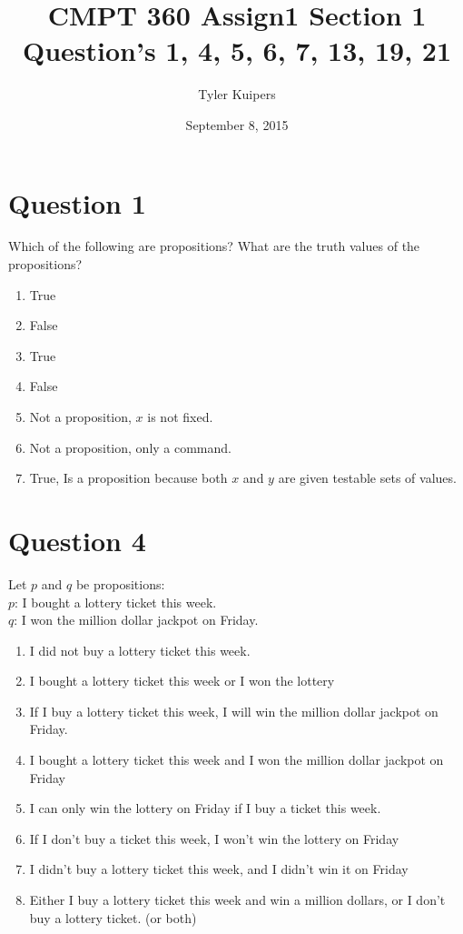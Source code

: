 \documentclass[12pt]{extarticle}
\title{CMPT 360 Assign1 Section 1\\ Question's 1, 4, 5, 6, 7, 13, 19, 21}
\author{Tyler Kuipers}
\date{September 8, 2015}
\begin{document}
\maketitle
\section*{Question 1}
	Which of the following are propositions? 
	What are the truth values of the propositions?
	\begin{enumerate}
		\item True
		\item False
		\item True
		\item False
		\item Not a proposition, $x$ is not fixed.
		\item Not a proposition, only a command.
		\item True, Is a proposition because both $x$ and $y$ are given testable sets of values.
	\end{enumerate}

\section*{Question 4}
	Let $p$ and $q$ be propositions:\\
		\hspace*{1cm}$p$: I bought a lottery ticket this week.\\
		\hspace*{1cm}$q$: I won the million dollar jackpot on Friday.\\
	\begin{enumerate}
		\item I did not buy a lottery ticket this week.
		\item I bought a lottery ticket this week or I won the lottery
		\item If I buy a lottery ticket this week, I will win the million dollar jackpot on Friday.
		\item I bought a lottery ticket this week and I won the million dollar jackpot on Friday
		\item I can only win the lottery on Friday if I buy a ticket this week.
		\item If I don't buy a ticket this week, I won't win the lottery on Friday
		\item I didn't buy a lottery ticket this week, and I didn't win it on Friday
		\item Either I buy a lottery ticket this week and win a million dollars, or I don't buy a lottery ticket. (or both)
	\end{enumerate}
\end{document}

